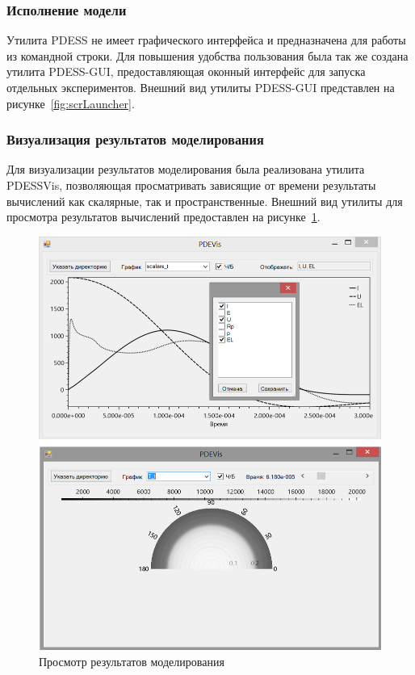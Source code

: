 \subsubsection{Исполнение модели}
Утилита PDESS не имеет графического интерфейса и предназначена для работы из 
командной строки. Для повышения удобства пользования была так же создана 
утилита PDESS-GUI, предоставляющая оконный интерфейс для запуска отдельных 
экспериментов. Внешний вид утилиты PDESS-GUI представлен на 
рисунке~\ref{fig:scrLauncher}.

\subsubsection{Визуализация результатов моделирования}
Для визуализации результатов моделирования была реализована утилита PDESSVis, 
позволяющая просматривать зависящие от времени результаты вычислений как 
скалярные, так и пространственные. Внешний вид утилиты для просмотра 
результатов вычислений предоставлен на рисунке~\ref{fig:scrVis}.

\begin{figure}
    \centering
    \includegraphics[width=\linewidth]{img/scr/vis}
    \caption{Просмотр результатов моделирования}
    \label{fig:scrVis}
\end{figure}

